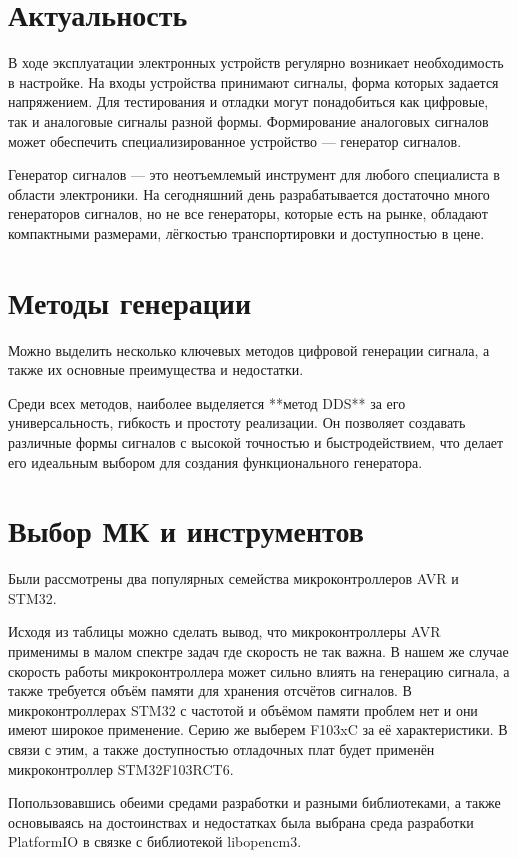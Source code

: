 \documentclass[a4paper, 14pt]{extarticle}
\begin{document}
\section*{Актуальность}
	В ходе эксплуатации электронных устройств регулярно возникает необходимость в настройке. На входы устройства принимают сигналы, форма которых задается напряжением. Для тестирования и отладки могут понадобиться как цифровые, так и аналоговые сигналы разной формы. Формирование аналоговых сигналов может обеспечить специализированное устройство --- генератор сигналов.
	
	Генератор сигналов --- это неотъемлемый инструмент для любого специалиста в области электроники. На сегодняшний день разрабатывается достаточно много генераторов сигналов, но не все генераторы, которые есть на рынке, обладают компактными размерами, лёгкостью транспортировки и доступностью в цене. 
	
	

\section*{Методы генерации}
Можно выделить несколько ключевых методов цифровой генерации сигнала, а также их основные преимущества и недостатки.

Среди всех методов, наиболее выделяется **метод DDS** за его универсальность,
 гибкость и простоту реализации. Он позволяет создавать различные формы сигналов
 с высокой точностью и быстродействием, что делает его идеальным выбором для создания функционального генератора.



\section*{Выбор МК и инструментов}
	Были рассмотрены два популярных семейства микроконтроллеров AVR и STM32.
	
	Исходя из таблицы можно сделать вывод, что микроконтроллеры AVR применимы в малом спектре задач где скорость не так важна. В нашем же случае скорость работы микроконтроллера может сильно влиять на генерацию сигнала, а также требуется объём памяти для хранения отсчётов сигналов. В микроконтроллерах STM32 с частотой и объёмом памяти проблем нет и они имеют широкое применение. Серию же выберем F103xC за её характеристики. В связи с этим, а также доступностью отладочных плат будет применён микроконтроллер STM32F103RCT6.
	
	Попользовавшись обеими средами разработки и разными библиотеками, а также основываясь на достоинствах и недостатках была выбрана среда разработки PlatformIO в связке с библиотекой libopencm3.
	
\end{document}
